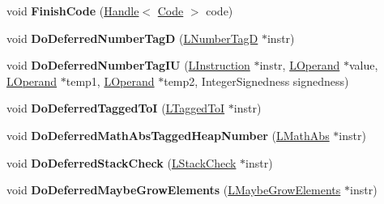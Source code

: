 \begin{DoxyCompactItemize}
\item 
void {\bfseries Finish\+Code} (\hyperlink{classv8_1_1internal_1_1_handle}{Handle}$<$ \hyperlink{classv8_1_1internal_1_1_code}{Code} $>$ code)\hypertarget{classv8_1_1internal_1_1_l_code_gen_a5278837d092b8413daa548719c34864c}{}\label{classv8_1_1internal_1_1_l_code_gen_a5278837d092b8413daa548719c34864c}

\item 
void {\bfseries Do\+Deferred\+Number\+TagD} (\hyperlink{classv8_1_1internal_1_1_l_number_tag_d}{L\+Number\+TagD} $\ast$instr)\hypertarget{classv8_1_1internal_1_1_l_code_gen_af3b589c0911c5e01a018ecee64b7e926}{}\label{classv8_1_1internal_1_1_l_code_gen_af3b589c0911c5e01a018ecee64b7e926}

\item 
void {\bfseries Do\+Deferred\+Number\+Tag\+IU} (\hyperlink{classv8_1_1internal_1_1_l_instruction}{L\+Instruction} $\ast$instr, \hyperlink{classv8_1_1internal_1_1_l_operand}{L\+Operand} $\ast$value, \hyperlink{classv8_1_1internal_1_1_l_operand}{L\+Operand} $\ast$temp1, \hyperlink{classv8_1_1internal_1_1_l_operand}{L\+Operand} $\ast$temp2, Integer\+Signedness signedness)\hypertarget{classv8_1_1internal_1_1_l_code_gen_a81fedc95085cf988c8e3d548e1c9a5f1}{}\label{classv8_1_1internal_1_1_l_code_gen_a81fedc95085cf988c8e3d548e1c9a5f1}

\item 
void {\bfseries Do\+Deferred\+Tagged\+ToI} (\hyperlink{classv8_1_1internal_1_1_l_tagged_to_i}{L\+Tagged\+ToI} $\ast$instr)\hypertarget{classv8_1_1internal_1_1_l_code_gen_a64133c7509f54dc0bd30c3bbb07db4ad}{}\label{classv8_1_1internal_1_1_l_code_gen_a64133c7509f54dc0bd30c3bbb07db4ad}

\item 
void {\bfseries Do\+Deferred\+Math\+Abs\+Tagged\+Heap\+Number} (\hyperlink{classv8_1_1internal_1_1_l_math_abs}{L\+Math\+Abs} $\ast$instr)\hypertarget{classv8_1_1internal_1_1_l_code_gen_aa6e5b6dba176a4572ce81dcc27b057aa}{}\label{classv8_1_1internal_1_1_l_code_gen_aa6e5b6dba176a4572ce81dcc27b057aa}

\item 
void {\bfseries Do\+Deferred\+Stack\+Check} (\hyperlink{classv8_1_1internal_1_1_l_stack_check}{L\+Stack\+Check} $\ast$instr)\hypertarget{classv8_1_1internal_1_1_l_code_gen_a273730f2504ea249d9deb8dde7b314ee}{}\label{classv8_1_1internal_1_1_l_code_gen_a273730f2504ea249d9deb8dde7b314ee}

\item 
void {\bfseries Do\+Deferred\+Maybe\+Grow\+Elements} (\hyperlink{classv8_1_1internal_1_1_l_maybe_grow_elements}{L\+Maybe\+Grow\+Elements} $\ast$instr)\hypertarget{classv8_1_1internal_1_1_l_code_gen_afe319c35fc8adaff35f3417fb7c833d6}{}\label{classv8_1_1internal_1_1_l_code_gen_afe319c35fc8adaff35f3417fb7c833d6}


\end{DoxyCompactItemize}
